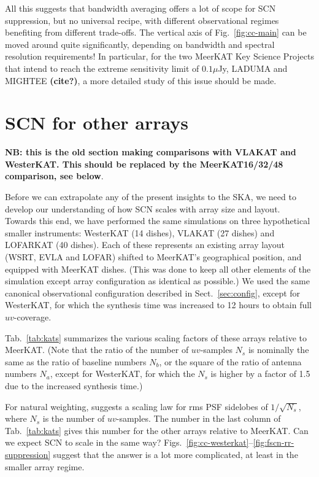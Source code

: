 \documentclass{aa}
\begin{document}
All this suggests that bandwidth averaging offers a lot of scope for SCN suppression, but no universal recipe, with different observational regimes benefiting from different trade-offs. The vertical axis of Fig.~\ref{fig:cc-main} can be moved around quite significantly, depending on bandwidth and spectral resolution requirements! In particular, for the two MeerKAT Key Science Projects that intend to reach the extreme sensitivity limit of $0.1\mu$Jy, LADUMA and MIGHTEE {\bf (cite?)}, a more detailed study of this issue should be made.

\section{SCN for other arrays}
\label{sec:other-arrays}

{\bf NB: this is the old section making comparisons with VLAKAT and WesterKAT. This should be replaced by the MeerKAT16/32/48 comparison, see below}.

Before we can extrapolate any of the present insights to the SKA, we need to develop our understanding of how SCN scales with array size and layout. Towards this end, we have performed the same simulations on three hypothetical smaller instruments: WesterKAT (14 dishes), VLAKAT (27 dishes) and LOFARKAT (40 dishes). Each of these represents an existing array layout (WSRT, EVLA and LOFAR) shifted to MeerKAT's geographical position, and equipped with MeerKAT dishes. (This was done to keep all other elements of the simulation except array configuration as identical as possible.) We used the same canonical observational configuration described in Sect.~\ref{sec:config}, except for WesterKAT, for which the synthesis time was increased to 12 hours to obtain full $uv$-coverage. 

Tab.~\ref{tab:kats} summarizes the various scaling factors of these arrays relative to MeerKAT. (Note that the ratio of the number of $uv$-samples $N_s$ is nominally the same as the ratio of baseline numbers $N_b$, or the square of the ratio of antenna numbers $N_a$, except for WesterKAT, for which the $N_s$ is higher by a factor of 1.5 due to the increased synthesis time.) 

For natural weighting, \citet{SKA49} suggests a scaling law for rms PSF sidelobes of $1/\sqrt{N_s}$, where $N_s$ is the number of $uv$-samples. The number in the last column of Tab.~\ref{tab:kats} gives this number for the other arrays relative to MeerKAT. Can we expect SCN to scale in the same way? Figs.~\ref{fig:cc-westerkat}--\ref{fig:fscn-rr-suppression} suggest that the answer is a lot more complicated, at least in the smaller array regime. 
\end{document}
